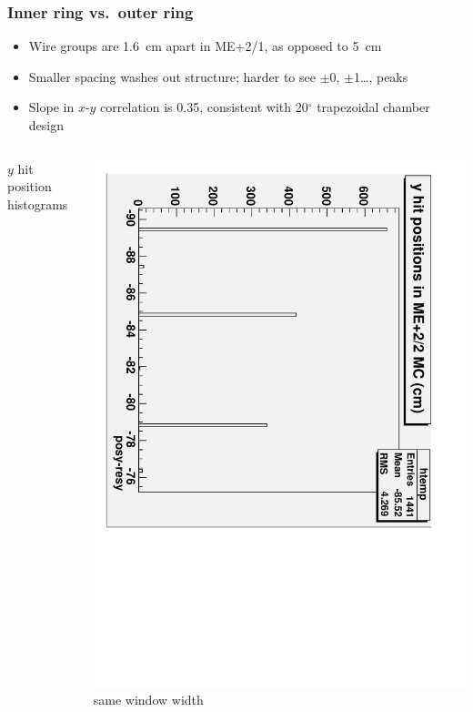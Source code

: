 \documentclass[compress]{beamer}
\begin{document}
\begin{frame}
\frametitle{Inner ring vs.\ outer ring}
\scriptsize
\begin{itemize}
\item Wire groups are 1.6~cm apart in ME+2/1, as opposed to 5~cm
\item Smaller spacing washes out structure; harder to see $\pm$0, $\pm$1\ldots, peaks
\item Slope in $x$-$y$ correlation is 0.35, consistent with 20$^\circ$ trapezoidal chamber design
\end{itemize}

\vfill
\begin{columns}
$y$ hit position histograms

\includegraphics[height=\linewidth, angle=90]{MC_y_hits_detail.pdf}
same window width


\end{columns}
\end{frame}
\end{document}
